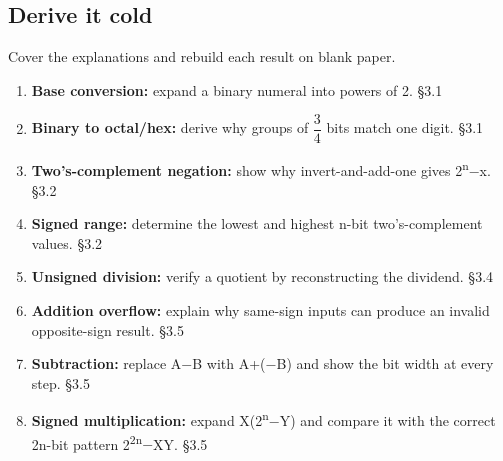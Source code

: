 \documentclass[11pt]{article}
\begin{document}
\begin{keepsection}
\section{Derive it cold}

Cover the explanations and rebuild each result on blank paper.

\begin{enumerate}
\item \textbf{Base conversion:} expand a binary numeral into powers of 2. \hfill{\small\color{FAUblue}§3.1}
\item \textbf{Binary to octal/hex:} derive why groups of {\small\ensuremath{\dfrac{3}{4}}} bits match one digit. \hfill{\small\color{FAUblue}§3.1}
\item \textbf{Two’s-complement negation:} show why invert-and-add-one gives 2\textsuperscript{n}\ensuremath{-}x. \hfill{\small\color{FAUblue}§3.2}
\item \textbf{Signed range:} determine the lowest and highest n-bit two’s-complement values. \hfill{\small\color{FAUblue}§3.2}
\item \textbf{Unsigned division:} verify a quotient by reconstructing the dividend. \hfill{\small\color{FAUblue}§3.4}
\item \textbf{Addition overflow:} explain why same-sign inputs can produce an invalid opposite-sign result. \hfill{\small\color{FAUblue}§3.5}
\item \textbf{Subtraction:} replace A\ensuremath{-}B with A+(\ensuremath{-}B) and show the bit width at every step. \hfill{\small\color{FAUblue}§3.5}
\item \textbf{Signed multiplication:} expand X(2\textsuperscript{n}\ensuremath{-}Y) and compare it with the correct 2n-bit pattern 2\textsuperscript{2n}\ensuremath{-}XY. \hfill{\small\color{FAUblue}§3.5}
\end{enumerate}
\end{keepsection}
\end{document}
